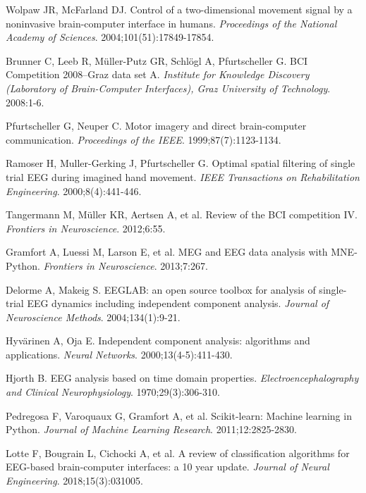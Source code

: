 \documentclass[11pt]{article}
\begin{document}
\newpage

\begin{thebibliography}{10}

Wolpaw JR, McFarland DJ.
\newblock Control of a two-dimensional movement signal by a noninvasive brain-computer interface in humans.
\newblock \emph{Proceedings of the National Academy of Sciences}. 2004;101(51):17849-17854.

Brunner C, Leeb R, Müller-Putz GR, Schlögl A, Pfurtscheller G.
\newblock BCI Competition 2008–Graz data set A.
\newblock \emph{Institute for Knowledge Discovery (Laboratory of Brain-Computer Interfaces), Graz University of Technology}. 2008:1-6.

Pfurtscheller G, Neuper C.
\newblock Motor imagery and direct brain-computer communication.
\newblock \emph{Proceedings of the IEEE}. 1999;87(7):1123-1134.

Ramoser H, Muller-Gerking J, Pfurtscheller G.
\newblock Optimal spatial filtering of single trial EEG during imagined hand movement.
\newblock \emph{IEEE Transactions on Rehabilitation Engineering}. 2000;8(4):441-446.

Tangermann M, Müller KR, Aertsen A, et al.
\newblock Review of the BCI competition IV.
\newblock \emph{Frontiers in Neuroscience}. 2012;6:55.

Gramfort A, Luessi M, Larson E, et al.
\newblock MEG and EEG data analysis with MNE-Python.
\newblock \emph{Frontiers in Neuroscience}. 2013;7:267.

Delorme A, Makeig S.
\newblock EEGLAB: an open source toolbox for analysis of single-trial EEG dynamics including independent component analysis.
\newblock \emph{Journal of Neuroscience Methods}. 2004;134(1):9-21.

Hyvärinen A, Oja E.
\newblock Independent component analysis: algorithms and applications.
\newblock \emph{Neural Networks}. 2000;13(4-5):411-430.

Hjorth B.
\newblock EEG analysis based on time domain properties.
\newblock \emph{Electroencephalography and Clinical Neurophysiology}. 1970;29(3):306-310.

Pedregosa F, Varoquaux G, Gramfort A, et al.
\newblock Scikit-learn: Machine learning in Python.
\newblock \emph{Journal of Machine Learning Research}. 2011;12:2825-2830.

Lotte F, Bougrain L, Cichocki A, et al.
\newblock A review of classification algorithms for EEG-based brain-computer interfaces: a 10 year update.
\newblock \emph{Journal of Neural Engineering}. 2018;15(3):031005.

\end{thebibliography}
\end{document}
